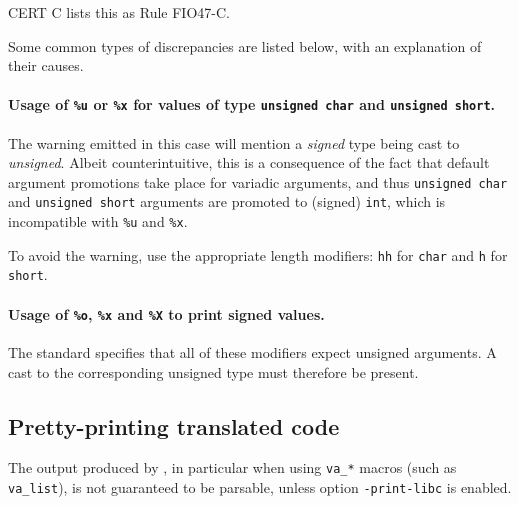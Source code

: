 CERT C lists this as Rule FIO47-C.

Some common types of discrepancies are listed below, with an explanation
of their causes.

\paragraph{Usage of \texttt{\%u} or \texttt{\%x} for values of type
  \texttt{unsigned char} and \texttt{unsigned short}.}

The warning emitted in this case will mention a
{\em signed} type being cast to {\em unsigned}.
Albeit counterintuitive, this is a consequence of the fact that default
argument promotions take place for variadic arguments, and thus
\verb+unsigned char+ and \verb+unsigned short+ arguments are promoted to
(signed) \verb+int+, which is incompatible with \verb+%u+ and \verb+%x+.

To avoid the warning, use the appropriate length modifiers:
\verb+hh+ for \verb+char+ and \verb+h+ for \verb+short+.

\paragraph{Usage of \texttt{\%o}, \texttt{\%x} and \texttt{\%X} to print
  signed values.}

The standard specifies that all of these modifiers expect unsigned arguments.
A cast to the corresponding unsigned type must therefore be present.

\subsection{Pretty-printing translated code}

The output produced by , in particular when using
\verb+va_*+ macros (such as \verb+va_list+), is not guaranteed to be
parsable, unless option \verb+-print-libc+ is enabled.
